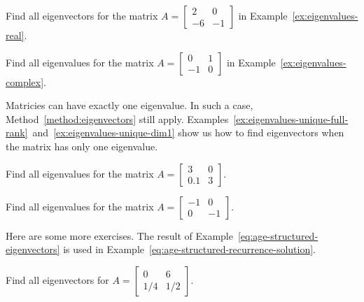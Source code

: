\documentclass[../main.tex]{subfiles}
\begin{document}
\begin{example}
  Find all eigenvectors for the matrix \(A = \begin{bmatrix} 2 & 0 \\ -6 & -1\end{bmatrix}\) in Example~\ref{ex:eigenvalues-real}.
\end{example}

\begin{example}
  Find all eigenvalues for the matrix \(A = \begin{bmatrix} 0 & 1 \\ -1 & 0 \end{bmatrix}\) in Example~\ref{ex:eigenvalues-complex}.
\end{example}

\clearpage

\faStar{} Matricies can have exactly one eigenvalue. In such a case, Method~\ref{method:eigenvectors} still apply. Examples~\ref{ex:eigenvalues-unique-full-rank}~and~\ref{ex:eigenvalues-unique-dim1} show us how to find eigenvectors when the matrix has only one eigenvalue.
\begin{example} \label{ex:eigenvalues-unique-full-rank}
  Find all eigenvalues for the matrix \(A = \begin{bmatrix} 3 & 0 \\ 0.1 & 3 \end{bmatrix}\).
\end{example}

\begin{example} \label{ex:eigenvalues-unique-dim1}
  Find all eigenvalues for the matrix \(A = \begin{bmatrix} -1 & 0 \\ 0 & -1 \end{bmatrix}\).
\end{example}
\clearpage

Here are some more exercises.  The result of Example~\ref{eq:age-structured-eigenvectors} is used in Example~\ref{eq:age-structured-recurrence-solution}.

\begin{example} \label{eq:age-structured-eigenvectors}
  Find all eigenvectors for \(A = \begin{bmatrix} 0 & 6 \\ 1/4 & 1/2 \end{bmatrix}\).

\end{example}
\end{document}
